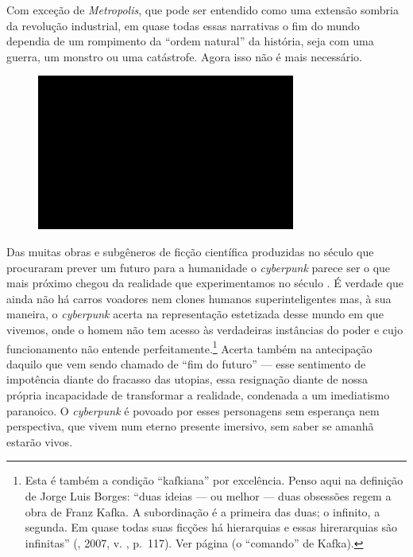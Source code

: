 Com exceção de \emph{Metropolis}, que pode ser entendido como uma
extensão sombria da revolução industrial, em quase todas essas
narrativas o fim do mundo dependia de um rompimento da ``ordem natural''
da história, seja com uma guerra, um monstro ou uma
catástrofe. Agora isso não é mais necessário.

\begin{figure}[!ht]

\centering
 \includegraphics[width=85mm]{./imgs/im1.jpg}
\caption{\tiny{}}

\end{figure}

Das muitas obras e subgêneros de ficção científica produzidas no século
 que procuraram prever um futuro para a humanidade o \emph{cyberpunk}
parece ser o que mais próximo chegou da realidade que experimentamos no
século . É verdade que ainda não há carros voadores nem clones
humanos superinteligentes mas, à sua maneira, o \emph{cyberpunk} acerta
na representação estetizada desse mundo em que vivemos, onde o homem não
tem acesso às verdadeiras instâncias do poder e cujo funcionamento não
entende perfeitamente.\footnote{Esta é também a condição ``kafkiana''
  por excelência. Penso aqui na definição de Jorge Luis Borges: ``duas
  ideias --- ou melhor --- duas obsessões regem a obra de Franz Kafka. A
  subordinação é a primeira das duas; o infinito, a segunda. Em quase
  todas suas ficções há hierarquias e essas hirerarquias são infinitas''
  (, 2007, v. , p.~117). Ver página  (o ``comando'' de
  Kafka).} Acerta também na antecipação daquilo que vem sendo chamado de
``fim do futuro'' --- esse sentimento de impotência diante do fracasso
das utopias, essa resignação diante de nossa própria incapacidade de
transformar a realidade, condenada a um imediatismo paranoico. O
\emph{cyberpunk} é povoado por esses personagens sem esperança nem
perspectiva, que vivem num eterno presente imersivo, sem saber se amanhã
estarão vivos.

